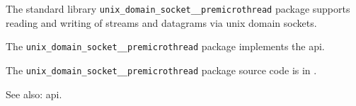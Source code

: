 
The standard library {\tt unix\_domain\_socket\_\_premicrothread} package supports reading and writing 
of streams and datagrams via unix domain sockets.

The {\tt unix\_domain\_socket\_\_premicrothread} package implements the  api.

The {\tt unix\_domain\_socket\_\_premicrothread} package source code is in .

See also:  api.
